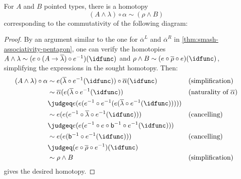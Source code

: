 \documentclass{article}
\newcommand{\smsh}{\wedge}
\renewcommand{\o}{\ensuremath{\circ}}
\newcommand{\sy}{^{-1}}
\newcommand{\alphabar}{\overline{\alpha}}
\newcommand{\rhobar}{\overline{\rho}}
\newcommand{\lambdabar}{\overline{\lambda}}
\newcommand{\two}{\mathsf{b}}
\begin{document}
\begin{thm}\label{thm:smash-unitors-triangle}
	For $A$ and $B$ pointed types, there is a homotopy
	\[(A \smsh \lambda) \o \alpha \sim (\rho \smsh B)\]
	corresponding to the commutativity of the following diagram:
	\begin{center}
	\end{center}
\end{thm}
\begin{proof}
	By an argument similar to the one for $\alphabar^L$ and $\alphabar^R$ in \autoref{thm:smash-associativity-pentagon}, one can verify the homotopies $A \smsh \lambda \sim (e \o (A \to \lambdabar) \o e\sy)(\idfunc)$ and $\rho \smsh B \sim (e \o \rhobar \o e)(\idfunc)$, simplifying the expressions in the sought homotopy. Then:
	\begin{align*}
		(A \smsh \lambda) \o \alpha
		&\sim e(\lambdabar \o e\sy(\idfunc)) \o \alphabar(\idfunc) &&\text{(simplification)}\\
		&\sim \alphabar(e(\lambdabar \o e\sy(\idfunc)) &&\text{(naturality of $\alphabar$)}\\
		&\judgeq e(e(e\sy \o e\sy (e(\lambdabar \o e\sy(\idfunc)))))\\
		&\sim e(e(e\sy \o \lambdabar \o e\sy(\idfunc))) &&\text{(cancelling)}\\
		&\judgeq e(e(e\sy \o e \o \two\sy \o e\sy(\idfunc)))\\
		&\sim e(e(\two\sy \o e\sy(\idfunc))) &&\text{(cancelling)}\\
		&\judgeq (e \o \rhobar \o e\sy)(\idfunc)\\
		&\sim \rho \smsh B &&\text{(simplification)}
	\end{align*}
	gives the desired homotopy.
\end{proof}
\end{document}
